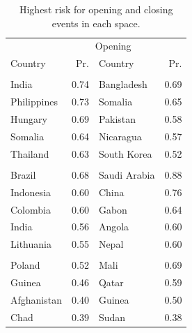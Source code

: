 \documentclass[
  11pt,
]{article}
\begin{document}
\begin{table}

\caption{\label{tab:topN}Highest risk for opening and closing events in each space.}
\centering
\begin{tabular}[t]{>{\raggedright\arraybackslash}p{12em}r>{\raggedright\arraybackslash}p{10em}r}
\toprule
\multicolumn{2}{c}{Closing} & \multicolumn{2}{c}{Opening} \\
\cmidrule(l{3pt}r{3pt}){1-2} \cmidrule(l{3pt}r{3pt}){3-4}
Country & Pr. & Country & Pr.\\
\midrule
\addlinespace[0.3em]
\multicolumn{4}{l}{\textbf{Associational}}\\
\hspace{1em}India & 0.74 & Bangladesh & 0.69\\
\hspace{1em}Philippines & 0.73 & Somalia & 0.65\\
\hspace{1em}Hungary & 0.69 & Pakistan & 0.58\\
\hspace{1em}Somalia & 0.64 & Nicaragua & 0.57\\
\hspace{1em}Thailand & 0.63 & South Korea & 0.52\\
\addlinespace[0.3em]
\multicolumn{4}{l}{\textbf{Economic}}\\
\hspace{1em}Brazil & 0.68 & Saudi Arabia & 0.88\\
\hspace{1em}Indonesia & 0.60 & China & 0.76\\
\hspace{1em}Colombia & 0.60 & Gabon & 0.64\\
\hspace{1em}India & 0.56 & Angola & 0.60\\
\hspace{1em}Lithuania & 0.55 & Nepal & 0.60\\
\addlinespace[0.3em]
\multicolumn{4}{l}{\textbf{Electoral}}\\
\hspace{1em}Poland & 0.52 & Mali & 0.69\\
\hspace{1em}Guinea & 0.46 & Qatar & 0.59\\
\hspace{1em}Afghanistan & 0.40 & Guinea & 0.50\\
\hspace{1em}Chad & 0.39 & Sudan & 0.38\\

\end{tabular}
\end{table}
\end{document}
